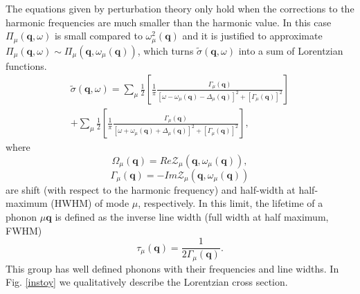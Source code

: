 The equations given by perturbation theory only hold when the corrections to the harmonic frequencies are much smaller than the harmonic value. In this case $\Pi_{\mu}(\mathbf{q},\omega)$ is small compared to $\omega_{\mu}^{2}(\mathbf{q})$ and it is justified to approximate 
$\Pi_{\mu}(\mathbf{q},\omega)\sim\Pi_{\mu}(\mathbf{q},\omega_{\mu}(\mathbf{q}))$, which turns $\tilde{\sigma}(\mathbf{q},\omega)$ into a sum of Lorentzian functions. 
\begin{multline}
 \tilde{\sigma}(\mathbf{q},\omega)=\sum_{\mu}\frac{1}{2}\left[\frac{1}{\pi}\frac{\Gamma_{\mu}(\mathbf{q})}{[\omega-\omega_{\mu}(\mathbf{q})-\Delta_{\mu}(\mathbf{q})]^{2}+[\Gamma_{\mu}(\mathbf{q})]^{2}}\right]\\+\sum_{
 \mu}\frac{1}{2}\left[\frac{1}{\pi}\frac{\Gamma_{\mu}(\mathbf{q})}{[\omega+\omega_{\mu}(\mathbf{q})+\Delta_{\mu}(\mathbf{q})]^{2}+[\Gamma_{\mu}(\mathbf{q})]^{2}}\right],
\end{multline}
where
\begin{equation}
 \label{lineshift}
 \Omega_{\mu}(\mathbf{q})=Re\mathcal{Z}_{\mu}(\mathbf{q},\omega_{\mu}(\mathbf{q})),
\end{equation}
\begin{equation}
 \label{linewidth}
 \Gamma_{\mu}(\mathbf{q})=-Im\mathcal{Z}_{\mu}(\mathbf{q},\omega_{\mu}(\mathbf{q}))
\end{equation}
are shift (with respect to the harmonic frequency) and half-width at half-maximum (HWHM) of mode $\mu$, respectively.
In this limit, the lifetime of a phonon $\mu\mathbf{q}$ is defined as the inverse line width (full width at half
maximum, FWHM)
\begin{equation}
\label{lifetime}
 \tau_{\mu}(\mathbf{q})=\frac{1}{2\Gamma_{\mu}(\mathbf{q})}.
\end{equation}
This group has well defined phonons with their frequencies and line widths. 
In Fig. \ref{instoy} we qualitatively describe the Lorentzian cross section.

